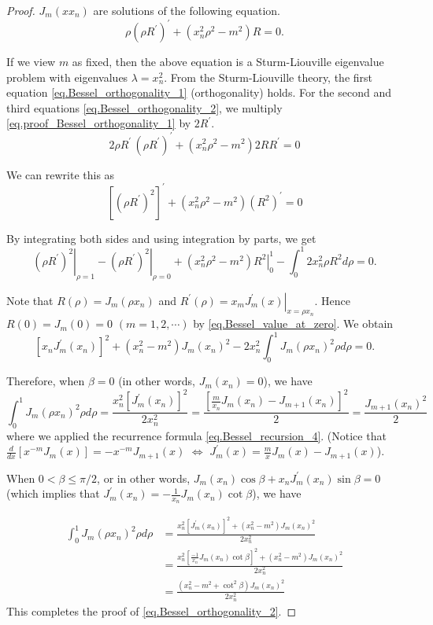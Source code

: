 \begin{proof} $J_m\left(x x_{n}\right)$ are solutions of the following equation. 
\begin{equation}\label{eq.proof_Bessel_orthogonality_1}
    \rho(\rho R^{\prime})^{\prime} + (x_n^2 \rho^2 - m^2) R = 0.
\end{equation}

If we view $m$ as fixed, then the above equation is a Sturm-Liouville eigenvalue problem with eigenvalues $\lambda=x_n^2$. From the Sturm-Liouville theory, the first equation \eqref{eq.Bessel_orthogonality_1} (orthogonality) holds. For the second and third equations \eqref{eq.Bessel_orthogonality_2}, we multiply \eqref{eq.proof_Bessel_orthogonality_1} by $2 R^{\prime}$.
$$
2 \rho R^{\prime}\, (\rho R^{\prime})^{\prime} +\left(x_n^2 \rho^2-m^2\right) 2 R R^{\prime}=0
$$

We can rewrite this as
$$
\left[\left(\rho R^{\prime}\right)^2\right]^{\prime}+\left(x_n^2 \rho^2-m^2\right)\left(R^2\right)^{\prime}=0
$$

By integrating both sides and using integration by parts, we get
$$
\left.\left(\rho R^{\prime}\right)^2\right|_{\rho=1}-\left.\left(\rho R^{\prime}\right)^2\right|_{\rho=0}+\left.\left(x_n^2 \rho^2-m^2\right) R^2\right|_0 ^1-\int_0^1 2 x_n^2 \rho R^2 d \rho=0 .
$$

Note that $R(\rho)=J_m\left(\rho x_n\right)$ and $R^{\prime}(\rho)=\left.x_m J_m^{\prime}(x)\right|_{x=\rho x_n}$. Hence $R(0)=J_m(0)=0$ $(m=1,2, \cdots)$ by \eqref{eq.Bessel_value_at_zero}. We obtain
$$
\left[x_n J_m^{\prime}(x_n)\right]^2+\left(x_n^2-m^2\right) J_m(x_n)^2-2 x_n^2 \int_0^1 J_m\left(\rho x_n\right)^2 \rho d \rho=0 .
$$


Therefore, when $\beta=0$ (in other words, $J_m(x_n)=0$), we have
$$
\int_0^1 J_m\left(\rho x_n\right)^2 \rho d \rho=\frac{x_n^2\left[J_m^{\prime}(x_n)\right]^2}{2 x_n^2}=\frac{\left[\frac{m}{x_n} J_m(x_n)-J_{m+1}(x_n)\right]^2}{2}=\frac{J_{m+1}(x_n)^2}{2}
$$
where we applied the recurrence formula \eqref{eq.Bessel_recursion_4}. (Notice that $\frac{d}{d x}\left[x^{-m} J_m(x)\right]=-x^{-m} J_{m+1}(x)$ $\Leftrightarrow$ $J_m^{\prime}(x) = \frac{m}{x} J_m(x)-J_{m+1}(x)$).

When $0<\beta \leq \pi / 2$, or in other words, $J_m(x_n) \cos \beta+x_n J_m^{\prime}(x_n)\sin \beta=0$ (which implies that $J_m^{\prime}(x_n) = -\frac{1}{x_n} J_m(x_n) \cot \beta$), we have

$$
\begin{aligned}
\int_0^1 J_m\left(\rho x_n\right)^2 \rho d \rho & =\frac{x_n^2\left[J_m^{\prime}(x_n)\right]^2+\left(x_n^2-m^2\right) J_m(x_n)^2}{2 x_n^2} 
\\
& =\frac{x_n^2\left[\frac{-1}{x_n} J_m(x_n) \cot \beta\right]^2+\left(x_n^2-m^2\right) J_m(x_n)^2}{2 x_n^2} 
\\
& =\frac{\left(x_n^2-m^2+\cot ^2 \beta\right) J_m(x_n)^2}{2 x_n^2}
\end{aligned}
$$
This completes the proof of \eqref{eq.Bessel_orthogonality_2}.
\end{proof}

